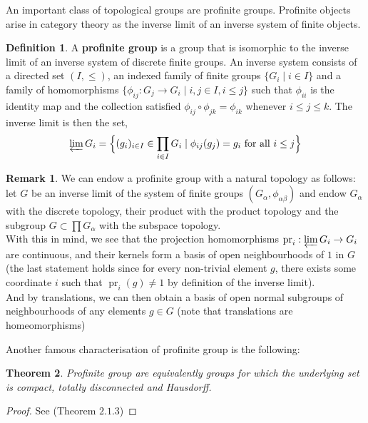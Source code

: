 \documentclass{article}
\theoremstyle{plain}
\newtheorem{theorem}{Theorem}[subsection]
\theoremstyle{definition}
\newtheorem{definition}[theorem]{Definition}
\newtheorem{remark}{Remark}
\DeclareMathOperator{\pr}{pr}
\begin{document}
\noindent An important class of topological groups are profinite groups. 
Profinite objects arise in category theory as the inverse limit of an inverse system of finite objects.

\begin{definition}
    A \textbf{profinite group} is a group that is isomorphic to the inverse limit of an inverse system of discrete finite groups.
    An inverse system consists of a directed set $(I, \leq)$, an indexed family of finite groups $\{G_i \mid i \in I\}$ and a family of homomorphisms $\{\phi_{ij} :G_j\rightarrow G_i \mid i,j\in I , i\leq j\}$ such that $\phi_{ii}$ is the identity map and the collection satisfied $\phi_{ij}\circ\phi_{jk} = \phi_{ik}$ whenever $i\leq j\leq k$. The inverse limit is then the set,
    $$\varprojlim G_i = \Bigl\{(g_i)_{i\in I} \in \prod_{i\in I}  G_i \mid \phi_{ij}(g_j)=g_i \text{ for all } i\leq j   \Bigr\}$$
\end{definition}

\begin{remark}
\label{prof_are_top}
    We can endow a profinite group with a natural topology as follows:
    let $G$ be an inverse limit of the system of finite groups $(G_{\alpha} , \phi_{\alpha\beta})$ and endow $G_{\alpha}$ with the discrete topology, their product with the product topology and the subgroup $G\subset \prod G_{\alpha}$ with the subspace topology.\\
    With this in mind, we see that the projection homomorphisms $\pr_i:\varprojlim G_i \rightarrow G_i$ are continuous, and their kernels form a basis of open neighbourhoods of $1$ in $G$ (the last statement holds since for every non-trivial element $g$, there exists some coordinate $i$ such that $\pr_i(g)\neq 1$ by definition of the inverse limit).\\
    And by translations, we can then obtain a basis of open normal subgroups of neighbourhoods of any elements $g\in G$ (note that translations are homeomorphisms)
\end{remark}

\noindent Another famous characterisation of profinite group is the following: 

\begin{theorem}
\label{profinite_groups_other}
    Profinite group are equivalently groups for which the underlying set is compact, totally disconnected and Hausdorff.
\end{theorem}
\begin{proof}
    See \cite{Ribes} (Theorem $2.1.3$)
\end{proof}
\end{document}
